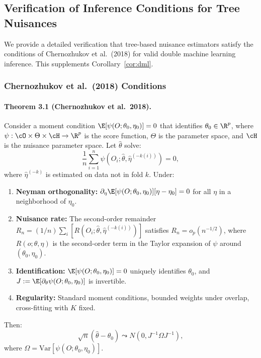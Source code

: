 \subsection{Verification of Inference Conditions for Tree Nuisances}
\label{app:dml-verification}

We provide a detailed verification that tree-based nuisance estimators satisfy the conditions of Chernozhukov et al.\ (2018) for valid double machine learning inference. This supplements Corollary~\ref{cor:dml}.

\subsubsection{Chernozhukov et al.\ (2018) Conditions}

\paragraph{Theorem 3.1 (Chernozhukov et al.\ 2018).}
Consider a moment condition $\E[\psi(O; \theta_0, \eta_0)] = 0$ that identifies $\theta_0 \in \R^p$, where $\psi: \cO \times \Theta \times \cH \to \R^p$ is the score function, $\Theta$ is the parameter space, and $\cH$ is the nuisance parameter space. Let $\hat\theta$ solve:
\[
\frac{1}{n} \sum_{i=1}^n \psi(O_i; \hat\theta, \hat\eta^{(-k(i))}) = 0,
\]
where $\hat\eta^{(-k)}$ is estimated on data not in fold $k$. Under:

\begin{enumerate}[label=\textbf{(C\arabic*)}]
\item \textbf{Neyman orthogonality:} $\partial_\eta \E[\psi(O; \theta_0, \eta_0)][\eta - \eta_0] = 0$ for all $\eta$ in a neighborhood of $\eta_0$.
\item \textbf{Nuisance rate:} The second-order remainder $R_n = (1/n)\sum_i [R(O_i; \hat\theta, \hat\eta^{(-k(i))})]$ satisfies $R_n = o_p(n^{-1/2})$, where $R(o; \theta, \eta)$ is the second-order term in the Taylor expansion of $\psi$ around $(\theta_0, \eta_0)$.
\item \textbf{Identification:} $\E[\psi(O; \theta_0, \eta_0)] = 0$ uniquely identifies $\theta_0$, and $J := \E[\partial_\theta \psi(O; \theta_0, \eta_0)]$ is invertible.
\item \textbf{Regularity:} Standard moment conditions, bounded weights under overlap, cross-fitting with $K$ fixed.
\end{enumerate}

Then:
\[
\sqrt{n}(\hat\theta - \theta_0) \leadsto N(0, J^{-1} \Omega J^{-1}),
\]
where $\Omega = \text{Var}[\psi(O; \theta_0, \eta_0)]$.

